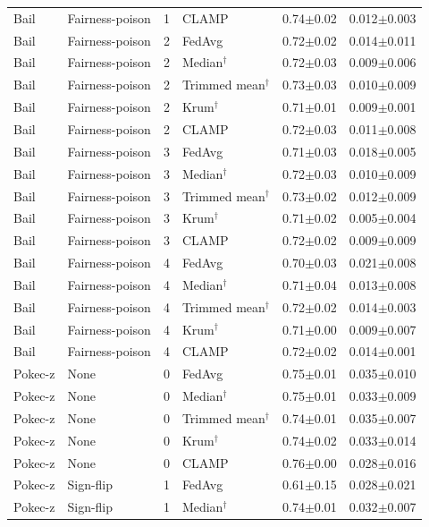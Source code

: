 \begin{longtable}{llclcc}
Bail & Fairness-poison & 1 & CLAMP & 0.74$\pm$0.02 & 0.012$\pm$0.003 \\
Bail & Fairness-poison & 2 & FedAvg & 0.72$\pm$0.02 & 0.014$\pm$0.011 \\
Bail & Fairness-poison & 2 & Median$^\dagger$ & 0.72$\pm$0.03 & 0.009$\pm$0.006 \\
Bail & Fairness-poison & 2 & Trimmed mean$^\dagger$ & 0.73$\pm$0.03 & 0.010$\pm$0.009 \\
Bail & Fairness-poison & 2 & Krum$^\dagger$ & 0.71$\pm$0.01 & 0.009$\pm$0.001 \\
Bail & Fairness-poison & 2 & CLAMP & 0.72$\pm$0.03 & 0.011$\pm$0.008 \\
Bail & Fairness-poison & 3 & FedAvg & 0.71$\pm$0.03 & 0.018$\pm$0.005 \\
Bail & Fairness-poison & 3 & Median$^\dagger$ & 0.72$\pm$0.03 & 0.010$\pm$0.009 \\
Bail & Fairness-poison & 3 & Trimmed mean$^\dagger$ & 0.73$\pm$0.02 & 0.012$\pm$0.009 \\
Bail & Fairness-poison & 3 & Krum$^\dagger$ & 0.71$\pm$0.02 & 0.005$\pm$0.004 \\
Bail & Fairness-poison & 3 & CLAMP & 0.72$\pm$0.02 & 0.009$\pm$0.009 \\
Bail & Fairness-poison & 4 & FedAvg & 0.70$\pm$0.03 & 0.021$\pm$0.008 \\
Bail & Fairness-poison & 4 & Median$^\dagger$ & 0.71$\pm$0.04 & 0.013$\pm$0.008 \\
Bail & Fairness-poison & 4 & Trimmed mean$^\dagger$ & 0.72$\pm$0.02 & 0.014$\pm$0.003 \\
Bail & Fairness-poison & 4 & Krum$^\dagger$ & 0.71$\pm$0.00 & 0.009$\pm$0.007 \\
Bail & Fairness-poison & 4 & CLAMP & 0.72$\pm$0.02 & 0.014$\pm$0.001 \\
Pokec-z & None & 0 & FedAvg & 0.75$\pm$0.01 & 0.035$\pm$0.010 \\
Pokec-z & None & 0 & Median$^\dagger$ & 0.75$\pm$0.01 & 0.033$\pm$0.009 \\
Pokec-z & None & 0 & Trimmed mean$^\dagger$ & 0.74$\pm$0.01 & 0.035$\pm$0.007 \\
Pokec-z & None & 0 & Krum$^\dagger$ & 0.74$\pm$0.02 & 0.033$\pm$0.014 \\
Pokec-z & None & 0 & CLAMP & 0.76$\pm$0.00 & 0.028$\pm$0.016 \\
Pokec-z & Sign-flip & 1 & FedAvg & 0.61$\pm$0.15 & 0.028$\pm$0.021 \\
Pokec-z & Sign-flip & 1 & Median$^\dagger$ & 0.74$\pm$0.01 & 0.032$\pm$0.007 \\

\end{longtable}
